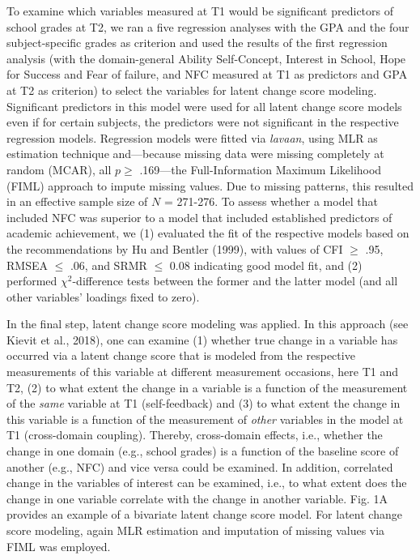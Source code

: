 \documentclass[
  man]{apa6}
\begin{document}
To examine which variables measured at T1 would be significant predictors of school grades at T2, we ran a five regression analyses with the GPA and the four subject-specific grades as criterion and used the results of the first regression analysis (with the domain-general Ability Self-Concept, Interest in School, Hope for Success and Fear of failure, and NFC measured at T1 as predictors and GPA at T2 as criterion) to select the variables for latent change score modeling. Significant predictors in this model were used for all latent change score models even if for certain subjects, the predictors were not significant in the respective regression models. Regression models were fitted via \emph{lavaan}, using MLR as estimation technique and---because missing data were missing completely at random (MCAR), all \(p\ge\) .169---the Full-Information Maximum Likelihood (FIML) approach to impute missing values. Due to missing patterns, this resulted in an effective sample size of \(N\) = 271-276. To assess whether a model that included NFC was superior to a model that included established predictors of academic achievement, we (1) evaluated the fit of the respective models based on the recommendations by Hu and Bentler (1999), with values of CFI \(\ge\) .95, RMSEA \(\le\) .06, and SRMR \(\le\) 0.08 indicating good model fit, and (2) performed \(\chi^2\)-difference tests between the former and the latter model (and all other variables' loadings fixed to zero).

In the final step, latent change score modeling was applied. In this approach (see Kievit et al., 2018), one can examine (1) whether true change in a variable has occurred via a latent change score that is modeled from the respective measurements of this variable at different measurement occasions, here T1 and T2, (2) to what extent the change in a variable is a function of the measurement of the \emph{same} variable at T1 (self-feedback) and (3) to what extent the change in this variable is a function of the measurement of \emph{other} variables in the model at T1 (cross-domain coupling). Thereby, cross-domain effects, i.e., whether the change in one domain (e.g., school grades) is a function of the baseline score of another (e.g., NFC) and vice versa could be examined. In addition, correlated change in the variables of interest can be examined, i.e., to what extent does the change in one variable correlate with the change in another variable. Fig. 1A provides an example of a bivariate latent change score model. For latent change score modeling, again MLR estimation and imputation of missing values via FIML was employed.
\end{document}

